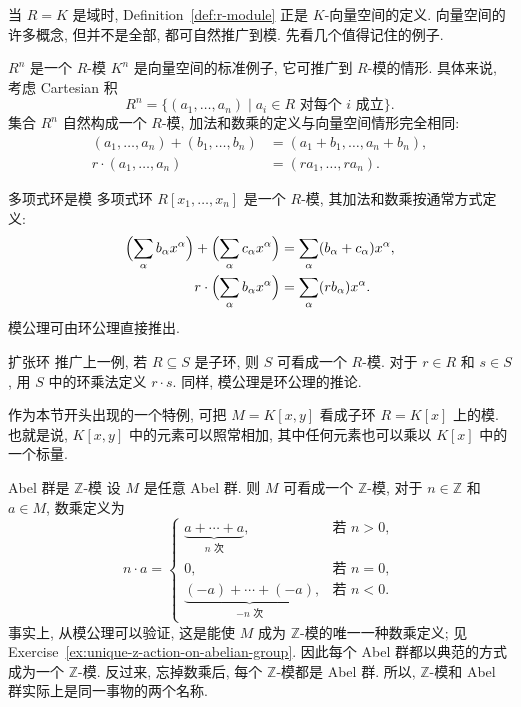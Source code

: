 当 $R=K$ 是域时, Definition~\ref{def:r-module} 正是 $K$-向量空间的定义. 向量空间的许多概念, 但并不是全部, 都可自然推广到模. 先看几个值得记住的例子.

\begin{Example}{$R^{n}$ 是一个 $R$-模}\leavevmode\label{ex:cartesian-power-as-module}
  $K^{n}$ 是向量空间的标准例子, 它可推广到 $R$-模的情形. 具体来说, 考虑 Cartesian 积
  \[
    R^{n}=\{(a_{1},\ldots,a_{n})\mid a_{i}\in R\text{ 对每个 }i\text{ 成立}\}.
  \]
  集合 $R^{n}$ 自然构成一个 $R$-模, 加法和数乘的定义与向量空间情形完全相同:
  \[
    \begin{aligned}
      (a_{1},\ldots,a_{n})+(b_{1},\ldots,b_{n})&=(a_{1}+b_{1},\ldots,a_{n}+b_{n}),\\
      r\cdot(a_{1},\ldots,a_{n})&=(ra_{1},\ldots,ra_{n}).
    \end{aligned}
  \]
\end{Example}

\begin{Example}{多项式环是模}\leavevmode\label{ex:polynomial-ring-as-module}
  多项式环 $R[x_{1},\ldots,x_{n}]$ 是一个 $R$-模, 其加法和数乘按通常方式定义:
  \[
    \begin{aligned}
      \Bigl(\sum_{\alpha}b_{\alpha}x^{\alpha}\Bigr)+
      \Bigl(\sum_{\alpha}c_{\alpha}x^{\alpha}\Bigr)
        &=\sum_{\alpha}(b_{\alpha}+c_{\alpha})x^{\alpha},\\
      r\cdot\Bigl(\sum_{\alpha}b_{\alpha}x^{\alpha}\Bigr)
        &=\sum_{\alpha}(rb_{\alpha})x^{\alpha}.
    \end{aligned}
  \]
  模公理可由环公理直接推出.
\end{Example}

\begin{Example}{扩张环}\leavevmode\label{ex:ring-extension-as-module}
  推广上一例, 若 $R\subseteq S$ 是子环, 则 $S$ 可看成一个 $R$-模. 对于 $r\in R$ 和 $s\in S$, 用 $S$ 中的环乘法定义 $r\cdot s$. 同样, 模公理是环公理的推论.

  作为本节开头出现的一个特例, 可把 $M=K[x,y]$ 看成子环 $R=K[x]$ 上的模. 也就是说, $K[x,y]$ 中的元素可以照常相加, 其中任何元素也可以乘以 $K[x]$ 中的一个\textquotedbl{}标量\textquotedbl{}.
\end{Example}

\begin{Example}{Abel 群是 $\mathbb{Z}$-模}\leavevmode\label{ex:abelian-group-as-z-module}
  设 $M$ 是任意 Abel 群. 则 $M$ 可看成一个 $\mathbb{Z}$-模, 对于 $n\in\mathbb{Z}$ 和 $a\in M$, 数乘定义为
  \[
    n\cdot a=
    \begin{cases}
      \underbrace{a+\cdots+a}_{n\text{ 次}}, & \text{若 } n>0,\\
      0, & \text{若 } n=0,\\
      \underbrace{(-a)+\cdots+(-a)}_{-n\text{ 次}}, & \text{若 } n<0.
    \end{cases}
  \]
  \BookPairedNote
    {事实上, 从模公理可以验证, 这是能使 $M$ 成为 $\mathbb{Z}$-模的唯一一种数乘定义; 见 Exercise~\ref{ex:unique-z-action-on-abelian-group}. 因此每个 Abel 群都以典范的方式成为一个 $\mathbb{Z}$-模.}
    {反过来, 忘掉数乘后, 每个 $\mathbb{Z}$-模都是 Abel 群. 所以, $\mathbb{Z}$-模和 Abel 群实际上是同一事物的两个名称.}
\end{Example}

